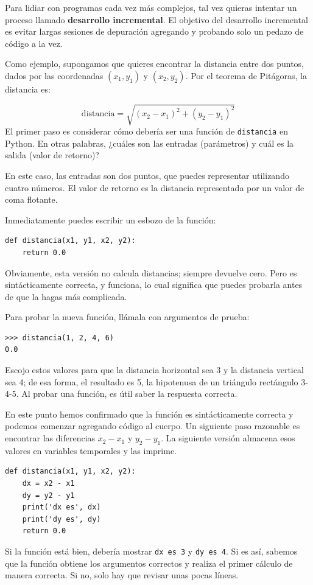 \documentclass[10pt]{book}
\begin{document}
Para lidiar con programas cada vez más complejos,
tal vez quieras intentar un proceso llamado
{\bf desarrollo incremental}.  El objetivo del desarrollo incremental
es evitar largas sesiones de depuración agregando y probando solo
un pedazo de código a la vez.

Como ejemplo, supongamos que quieres encontrar la distancia entre dos
puntos, dados por las coordenadas $(x_1, y_1)$ y $(x_2, y_2)$.
Por el teorema de Pitágoras, la distancia es:

\begin{displaymath}
\mathrm{distancia} = \sqrt{(x_2 - x_1)^2 + (y_2 - y_1)^2}
\end{displaymath}
%
El primer paso es considerar cómo debería ser una función de {\tt distancia}
en Python.  En otras palabras, ¿cuáles son las entradas (parámetros)
y cuál es la salida (valor de retorno)?

En este caso, las entradas son dos puntos, que puedes representar
utilizando cuatro números.  El valor de retorno es la distancia representada por
un valor de coma flotante.

Inmediatamente puedes escribir un esbozo de la función:

\begin{verbatim}
def distancia(x1, y1, x2, y2):
    return 0.0
\end{verbatim}
%
Obviamente, esta versión no calcula distancias; siempre devuelve
cero.  Pero es sintácticamente correcta, y funciona, lo cual significa que
puedes probarla antes de que la hagas más complicada.

Para probar la nueva función, llámala con argumentos de prueba:

\begin{verbatim}
>>> distancia(1, 2, 4, 6)
0.0
\end{verbatim}
%
Escojo estos valores para que la distancia horizontal sea 3 y la
distancia vertical sea 4; de esa forma, el resultado es 5, la hipotenusa
de un triángulo rectángulo 3-4-5. Al probar una función, es
útil saber la respuesta correcta.

En este punto hemos confirmado que la función es sintácticamente
correcta y podemos comenzar agregando código al cuerpo.
Un siguiente paso razonable es encontrar las diferencias
$x_2 - x_1$ y $y_2 - y_1$.  La siguiente versión almacena esos valores en
variables temporales y las imprime.

\begin{verbatim}
def distancia(x1, y1, x2, y2):
    dx = x2 - x1
    dy = y2 - y1
    print('dx es', dx)
    print('dy es', dy)
    return 0.0
\end{verbatim}
%
Si la función está bien, debería mostrar \verb"dx es 3" y
\verb"dy es 4".  Si es así, sabemos que la función obtiene los argumentos
correctos y realiza el primer cálculo de manera correcta.  Si no,
solo hay que revisar unas pocas líneas.
\end{document}
